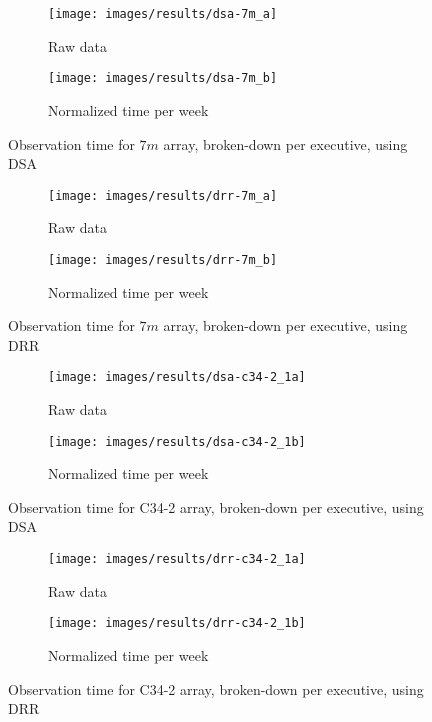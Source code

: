 \begin{figure}[h!]
\centering
	\begin{subfigure}[b]{0.49\textwidth}
		\texttt{[image: images/results/dsa-7m\_a]}
        \caption{Raw data} 
    \end{subfigure} 
    \begin{subfigure}[b]{0.49\textwidth}
    		\texttt{[image: images/results/dsa-7m\_b]}
            \caption{Normalized time per week} 
    \end{subfigure}
    \caption{Observation time for $7m$ array, broken-down per executive, using DSA}
    \label{fig:dsa-7m-exec}
\end{figure}

\begin{figure}[h!]
\centering
	\begin{subfigure}[b]{0.49\textwidth}
		\texttt{[image: images/results/drr-7m\_a]}
        \caption{Raw data} 
    \end{subfigure} 
    \begin{subfigure}[b]{0.49\textwidth}
    		\texttt{[image: images/results/drr-7m\_b]}
            \caption{Normalized time per week} 
    \end{subfigure}
    \caption{Observation time for $7m$ array, broken-down per executive, using DRR}
    \label{fig:drr-7m-exec}
\end{figure}

\begin{figure}[h!]
\centering
	\begin{subfigure}[b]{0.49\textwidth}
		\texttt{[image: images/results/dsa-c34-2\_1a]}
        \caption{Raw data} 
    \end{subfigure} 
    \begin{subfigure}[b]{0.49\textwidth}
    		\texttt{[image: images/results/dsa-c34-2\_1b]}
            \caption{Normalized time per week} 
    \end{subfigure}
    \caption{Observation time for C34-2 array, broken-down per executive, using DSA}
    \label{fig:dsa-c34-2-exec}
\end{figure}

\begin{figure}[h!]
\centering
	\begin{subfigure}[b]{0.49\textwidth}
		\texttt{[image: images/results/drr-c34-2\_1a]}
        \caption{Raw data} 
    \end{subfigure} 
    \begin{subfigure}[b]{0.49\textwidth}
    		\texttt{[image: images/results/drr-c34-2\_1b]}
            \caption{Normalized time per week} 
    \end{subfigure}
    \caption{Observation time for C34-2 array, broken-down per executive, using DRR}
    \label{fig:drr-c34-2-exec}
\end{figure}

